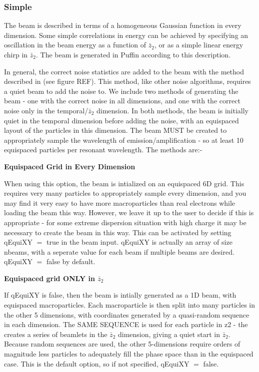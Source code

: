 \documentclass[12pt]{article}%
\begin{document}
\subsubsection{Simple}

The beam is described in terms of a homogeneous Gaussian function in every dimension. Some simple correlations in energy can be achieved by specifying an oscillation in the beam energy as a function of $\bar{z}_2$, or as a simple linear energy chirp in $\bar{z}_2$. The beam is generated in Puffin according to this description.

In general, the correct noise statistics are added to the beam with the method described in \cite{noise1} (see figure REF). This method, like other noise algorithms, requires a quiet beam to add the noise to. We include two methods of generating the beam - one with the correct noise in all dimensions, and one with the correct noise only in the temporal/$\bar{z}_2$ dimension. In both methods, the beam is initially quiet in the temporal dimension before adding the noise, with an equispaced layout of the particles in this dimension. The beam MUST be created to appropriately sample the wavelength of emission/amplification - so at least 10 equispaced particles per resonant wavelength. The methods are:-




{\bf Equispaced Grid in Every Dimension}

When using this option, the beam is intialized on an equispaced 6D grid. This requires very many particles to appropriately sample every dimension, and you may find it very easy to have more macroparticles than real electrons while loading the beam this way. However, we leave it up to the user to decide if this is appropriate - for some extreme dispersion situation with high charge it may be necessary to create the beam in this way.  This can be activated by setting qEquiXY $=$ true in the beam input. qEquiXY is actually an array of size nbeams, with a seperate value for each beam if multiple beams are desired. qEquiXY $=$ false by default.

{\bf Equispaced grid ONLY in $\bar{z}_2$}

If qEquiXY is false, then the beam is intially generated as a 1D beam, with equispaced macroparticles. Each macroparticle is then split into many particles in the other 5 dimensions, with coordinates generated by a quasi-random sequence in each dimension. The SAME SEQUENCE is used for each particle in z2 - the creates a series of beamlets in the $\bar{z}_2$ dimension, giving a quiet start in $\bar{z}_2$. Because random sequences are used, the other 5-dimensions require orders of magnitude less particles to adequately fill the phase space than in the equispaced case. This is the default option, so if not specified, qEquiXY $=$ false. 
\end{document}
